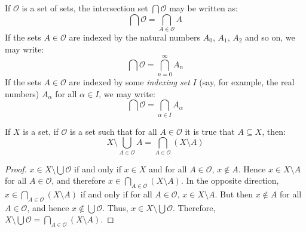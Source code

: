             \begin{notation}
                If $\mathcal{O}$ is a set of sets, the intersection set
                $\bigcap\mathcal{O}$ may be written as:
                \begin{equation}
                    \bigcap\mathcal{O}=\bigcap_{A\in\mathcal{O}}A
                \end{equation}
                If the sets $A\in\mathcal{O}$ are indexed by the natural
                numbers $A_{0}$, $A_{1}$, $A_{2}$ and so on, we may write:
                \begin{equation}
                    \bigcap\mathcal{O}=\bigcap_{n=0}^{\infty}A_{n}
                \end{equation}
                If the sets $A\in\mathcal{O}$ are indexed by some
                \textit{indexing set} $I$ (say, for example, the real numbers)
                $A_{\alpha}$ for all $\alpha\in{I}$, we may write:
                \begin{equation}
                    \bigcap\mathcal{O}=\bigcap_{\alpha\in{I}}A_{\alpha}
                \end{equation}
            \end{notation}
            \begin{theorem}
                If $X$ is a set, if $\mathcal{O}$ is a set such that for all
                $A\in\mathcal{O}$ it is true that $A\subseteq{X}$, then:
                \begin{equation}
                    X\setminus\bigcup_{A\in\mathcal{O}}A=
                        \bigcap_{A\in\mathcal{O}}(X\setminus{A})
                \end{equation}
            \end{theorem}
            \begin{proof}
                $x\in{X}\setminus\bigcup\mathcal{O}$ if and only if
                $x\in{X}$ and for all $A\in\mathcal{O}$, $x\notin{A}$. Hence
                $x\in{X}\setminus{A}$ for all $A\in\mathcal{O}$, and therefore
                $x\in\bigcap_{A\in\mathcal{O}}(X\setminus{A})$. In the opposite
                direction, $x\in\bigcap_{A\in\mathcal{O}}(X\setminus{A})$ if
                and only if for all $A\in\mathcal{O}$, $x\in{X}\setminus{A}$.
                But then $x\notin{A}$ for all $A\in\mathcal{O}$, and hence
                $x\notin\bigcup\mathcal{O}$. Thus,
                $x\in{X}\setminus\bigcup\mathcal{O}$. Therefore,
                $X\setminus\bigcup\mathcal{O}=\bigcap_{A\in\mathcal{O}}(X\setminus{A})$.
            \end{proof}
